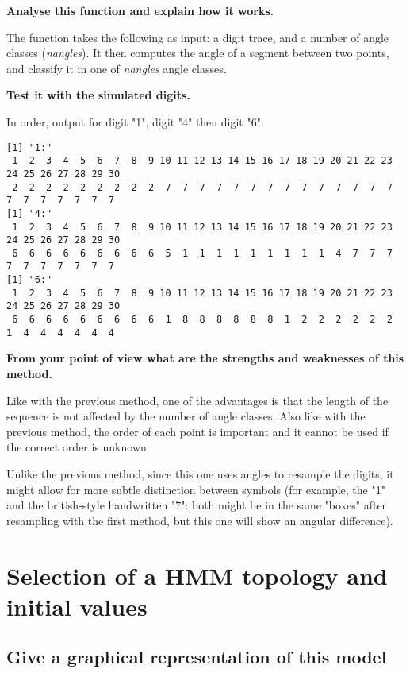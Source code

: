 \documentclass[a4paper]{article}
\begin{document}
\textbf{Analyse this function and explain how it works.} \newline

The function takes the following as input: a digit trace, and a number of angle classes ({\it nangles}). It then computes the angle of a segment between two points, and classify it in one of {\it nangles} angle classes.  \newline

\textbf{Test it with the simulated digits.} \newline

In order, output for digit "1", digit "4" then digit "6":

\begin{lstlisting}
[1] "1:"
 1  2  3  4  5  6  7  8  9 10 11 12 13 14 15 16 17 18 19 20 21 22 23 24 25 26 27 28 29 30 
 2  2  2  2  2  2  2  2  2  7  7  7  7  7  7  7  7  7  7  7  7  7  7  7  7  7  7  7  7  7 
[1] "4:"
 1  2  3  4  5  6  7  8  9 10 11 12 13 14 15 16 17 18 19 20 21 22 23 24 25 26 27 28 29 30 
 6  6  6  6  6  6  6  6  6  5  1  1  1  1  1  1  1  1  1  4  7  7  7  7  7  7  7  7  7  7 
[1] "6:"
 1  2  3  4  5  6  7  8  9 10 11 12 13 14 15 16 17 18 19 20 21 22 23 24 25 26 27 28 29 30 
 6  6  6  6  6  6  6  6  6  1  8  8  8  8  8  8  1  2  2  2  2  2  2  1  4  4  4  4  4  4 
\end{lstlisting}

\textbf{From your point of view what are the strengths and weaknesses of this method.} \newline

Like with the previous method, one of the advantages is that the length of the sequence is not affected by the number of angle classes. Also like with the previous method, the order of each point is important and it cannot be used if the correct order is unknown. \newline

Unlike the previous method, since this one uses angles to resample the digits, it might allow for more subtle distinction between symbols (for example, the "1" and the british-style handwritten "7": both might be in the same "boxes" after resampling with the first method, but this one will show an angular difference).

\section{Selection of a HMM topology and initial values}

\subsection{Give a graphical representation of this model}
\end{document}
